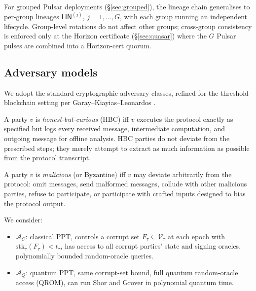 \begin{remark}
For grouped Pulsar deployments (\S\ref{sec:grouped}), the lineage chain
generalises to per-group lineages
$\mathsf{LIN}^{(j)}$, $j = 1, \ldots, G$, with each group running an
independent lifecycle. Group-level rotations do not affect other
groups; cross-group consistency is enforced only at the Horizon
certificate (\S\ref{sec:quasar}) where the $G$ Pulsar pulses are
combined into a Horizon-cert quorum.
\end{remark}

\subsection{Adversary models}
\label{sec:formal-model:adv}

We adopt the standard cryptographic adversary classes, refined for the
threshold-blockchain setting per Garay--Kiayias--Leonardos
\cite{garaybackbone}.

\begin{definition}
\label{def:hbc}
A party $v$ is \emph{honest-but-curious} (HBC) iff $v$ executes the
protocol exactly as specified but logs every received message,
intermediate computation, and outgoing message for offline analysis.
HBC parties do not deviate from the prescribed steps; they merely
attempt to extract as much information as possible from the protocol
transcript.
\end{definition}

\begin{definition}[Malicious]
\label{def:malicious}
A party $v$ is \emph{malicious} (or Byzantine) iff $v$ may deviate
arbitrarily from the protocol: omit messages, send malformed messages,
collude with other malicious parties, refuse to participate, or
participate with crafted inputs designed to bias the protocol output.
\end{definition}

\begin{definition}
\label{def:adv-classes}
We consider:
\begin{itemize}[nosep]
  \item $\mathcal{A}_C$: classical PPT, controls a corrupt set
        $F_\tau \subseteq \mathcal{V}_\tau$ at each epoch with
        $\mathrm{stk}_\tau(F_\tau) < t_\tau$, has access to all corrupt
        parties' state and signing oracles, polynomially bounded
        random-oracle queries.
  \item $\mathcal{A}_Q$: quantum PPT, same corrupt-set bound, full
        quantum random-oracle access (QROM), can run Shor and Grover
        in polynomial quantum time.
\end{itemize}
\end{definition}

